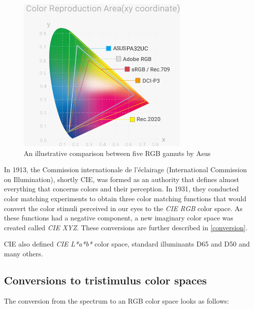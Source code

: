 \begin{figure}[h]
	\centering
	\includegraphics[width=0.6\linewidth]{img/gamut.jpg}
	\caption[ASUS RGB]{An illustrative comparison between five RGB gamuts by Asus \footnotemark}
	\label{fig:gamut}
\end{figure}

In 1913, the Commission internationale de l'éclairage (International Commission on Illumination), shortly CIE, was formed as an authority that defines almost everything that concerns colors and their perception. In 1931, they conducted color matching experiments to obtain three color matching functions that would convert the color stimuli perceived in our eyes to the \emph{CIE RGB} color space. As these functions had a negative component, a new imaginary color space was created called \emph{CIE XYZ}. These conversions are further described in \autoref{conversion}.

CIE also defined \emph{CIE L*a*b*} color space, standard illuminants D65 and D50 and many others.

\subsection{Conversions to tristimulus color spaces}
\label{conversion}

The conversion from the spectrum to an RGB color space looks as follows:

